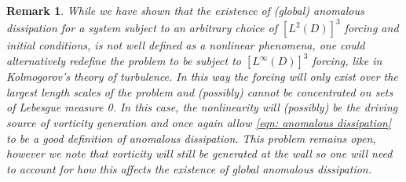 \documentclass[11pt, reqno]{article}
\def\red{\textcolor{red}}
\newtheorem{remark}[theorem]{Remark}
\newcommand{\ethan}[1]{\red{Ethan: #1}} %
\def\grad{\nabla}
\def\E{\mathbf{E}}
\def\H{{\mathcal H}}
\begin{document}
\begin{remark}
    While we have shown that the existence of (global) anomalous dissipation for a system subject to an arbitrary choice of $[L^2(D)]^3$ forcing and initial conditions, is not well defined as a nonlinear phenomena, one could alternatively redefine the problem to be subject to $[L^\infty(D)]^3$ forcing, like in Kolmogorov's theory of turbulence. In this way the forcing will only exist over the largest length scales of the problem and (possibly) cannot be concentrated on sets of Lebesgue measure 0. In this case, the nonlinearity will (possibly) be the driving source of vorticity generation and once again allow \eqref{eqn: anomalous dissipation} to be a good definition of anomalous dissipation. This problem remains open, however we note that vorticity will still be generated at the wall so one will need to account for how this affects the existence of global anomalous dissipation.
\end{remark}

\end{document}
